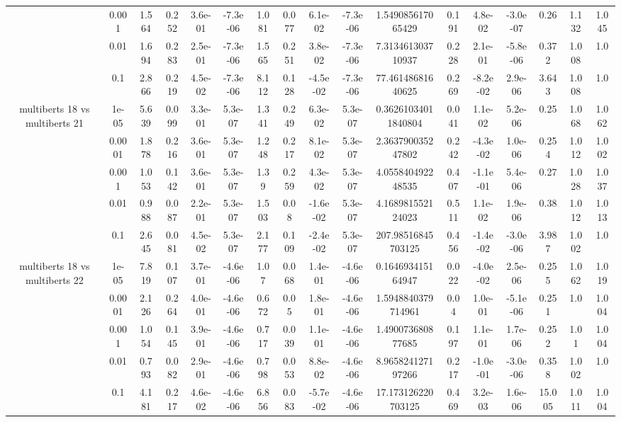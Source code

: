 \begin{tabular}{|c|c|c|c|c|c|c|c|c|c|c|c|c|c|c|c|c|}
 & 0.001 & 1.564 & 0.252 & 3.6e-01 & -7.3e-06 & 1.081 & 0.077 & 6.1e-02 & -7.3e-06 & 1.549085617065429 & 0.191 & 4.8e-02 & -3.0e-07 & 0.26 & 1.132 & 1.045 \\
 & 0.01 & 1.694 & 0.283 & 2.5e-01 & -7.3e-06 & 1.565 & 0.251 & 3.8e-02 & -7.3e-06 & 7.313461303710937 & 0.228 & 2.1e-01 & -5.8e-06 & 0.372 & 1.008 & 1.0 \\
 & 0.1 & 2.866 & 0.219 & 4.5e-02 & -7.3e-06 & 8.112 & 0.128 & -4.5e-02 & -7.3e-06 & 77.46148681640625 & 0.269 & -8.2e-02 & 2.9e-06 & 3.643 & 1.008 & 1.0 \\
\hline
\multirow{5}{*}{multiberts 18 vs multiberts 21} & 1e-05 & 5.639 & 0.099 & 3.3e-01 & 5.3e-07 & 1.341 & 0.249 & 6.3e-02 & 5.3e-07 & 0.36261034011840804 & 0.041 & 1.1e-02 & 5.2e-06 & 0.25 & 1.068 & 1.062 \\
 & 0.0001 & 1.878 & 0.216 & 3.6e-01 & 5.3e-07 & 1.248 & 0.217 & 8.1e-02 & 5.3e-07 & 2.363790035247802 & 0.242 & -4.3e-02 & 1.0e-06 & 0.254 & 1.012 & 1.002 \\
 & 0.001 & 1.053 & 0.142 & 3.6e-01 & 5.3e-07 & 1.39 & 0.259 & 4.3e-02 & 5.3e-07 & 4.055840492248535 & 0.407 & -1.1e-01 & 5.4e-06 & 0.27 & 1.028 & 1.037 \\
 & 0.01 & 0.988 & 0.087 & 2.2e-01 & 5.3e-07 & 1.503 & 0.08 & -1.6e-02 & 5.3e-07 & 4.168981552124023 & 0.511 & 1.1e-02 & 1.9e-06 & 0.38 & 1.012 & 1.013 \\
 & 0.1 & 2.645 & 0.081 & 4.5e-02 & 5.3e-07 & 2.177 & 0.109 & -2.4e-02 & 5.3e-07 & 207.98516845703125 & 0.456 & -1.4e-02 & -3.0e-06 & 3.987 & 1.002 & 1.0 \\
\hline
\multirow{5}{*}{multiberts 18 vs multiberts 22} & 1e-05 & 7.819 & 0.107 & 3.7e-01 & -4.6e-06 & 1.07 & 0.068 & 1.4e-01 & -4.6e-06 & 0.164693415164947 & 0.022 & -4.0e-02 & 2.5e-06 & 0.255 & 1.062 & 1.019 \\
 & 0.0001 & 2.126 & 0.264 & 4.0e-01 & -4.6e-06 & 0.672 & 0.05 & 1.8e-01 & -4.6e-06 & 1.5948840379714961 & 0.04 & 1.0e-01 & -5.1e-06 & 0.251 & 1.0 & 1.004 \\
 & 0.001 & 1.054 & 0.145 & 3.9e-01 & -4.6e-06 & 0.717 & 0.039 & 1.1e-01 & -4.6e-06 & 1.490073680877685 & 0.197 & 1.1e-01 & 1.7e-06 & 0.252 & 1.01 & 1.004 \\
 & 0.01 & 0.793 & 0.082 & 2.9e-01 & -4.6e-06 & 0.798 & 0.053 & 8.8e-02 & -4.6e-06 & 8.965824127197266 & 0.217 & -1.0e-01 & -3.0e-06 & 0.358 & 1.002 & 1.0 \\
 & 0.1 & 4.181 & 0.217 & 4.6e-02 & -4.6e-06 & 6.856 & 0.083 & -5.7e-02 & -4.6e-06 & 17.173126220703125 & 0.469 & 3.2e-03 & 1.6e-06 & 15.005 & 1.011 & 1.004 \\

\end{tabular}
